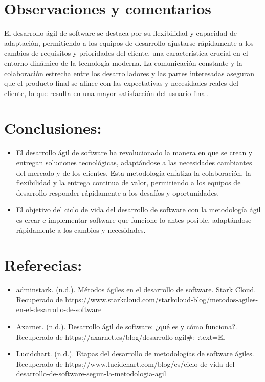 \documentclass{article}
\begin{document}
\section{Observaciones y comentarios}
El desarrollo ágil de software se destaca por su flexibilidad y capacidad de adaptación, permitiendo a los equipos de desarrollo ajustarse rápidamente a los cambios de requisitos y prioridades del cliente, una característica crucial en el entorno dinámico de la tecnología moderna. La comunicación constante y la colaboración estrecha entre los desarrolladores y las partes interesadas aseguran que el producto final se alinee con las expectativas y necesidades reales del cliente, lo que resulta en una mayor satisfacción del usuario final.
\section{Conclusiones:}
\begin{itemize}
    \item El desarrollo ágil de software ha revolucionado la manera en que se crean y entregan soluciones tecnológicas, adaptándose a las necesidades cambiantes del mercado y de los clientes. Esta metodología enfatiza la colaboración, la flexibilidad y la entrega continua de valor, permitiendo a los equipos de desarrollo responder rápidamente a los desafíos y oportunidades. 
    \item El objetivo del ciclo de vida del desarrollo de software con la metodología ágil es crear e implementar software que funcione lo antes posible, adaptándose rápidamente a los cambios y necesidades.
\end{itemize}

\section{Referecias:}
\begin{itemize}
    \item adminstark. (n.d.). Métodos ágiles en el desarrollo de software. Stark Cloud. Recuperado de https://www.starkcloud.com/starkcloud-blog/metodos-agiles-en-el-desarrollo-de-software
    \item Axarnet. (n.d.). Desarrollo ágil de software: ¿qué es y cómo funciona?. Recuperado de https://axarnet.es/blog/desarrollo-agil#:~:text=El%
    \item Lucidchart. (n.d.). Etapas del desarrollo de metodologías de software ágiles. Recuperado de https://www.lucidchart.com/blog/es/ciclo-de-vida-del-desarrollo-de-software-segun-la-metodologia-agil
\end{itemize}
\end{document}
